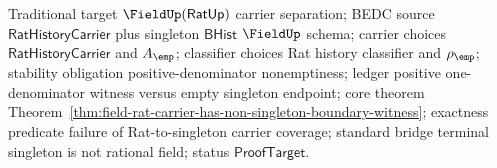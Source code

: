 Traditional target $\FieldUp(\mathsf{RatUp})$ carrier separation; BEDC source
$\mathsf{RatHistoryCarrier}$ plus singleton $\mathsf{BHist}$ $\FieldUp$ schema;
carrier choices $\mathsf{RatHistoryCarrier}$ and $A_{\emp}$; classifier choices
Rat history classifier and $\rho_{\emp}$; stability obligation
positive-denominator nonemptiness; ledger positive one-denominator witness versus
empty singleton endpoint; core theorem
Theorem~\ref{thm:field-rat-carrier-has-non-singleton-boundary-witness};
exactness predicate failure of Rat-to-singleton carrier coverage; standard
bridge terminal singleton is not rational field; status $\mathsf{ProofTarget}$.
